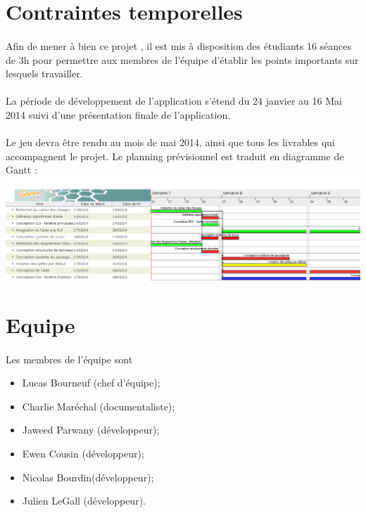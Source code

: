 \section{Contraintes temporelles}
\paragraph*{}
Afin de mener à bien ce projet , il est mis à disposition des étudiants 16 séances de 3h pour permettre aux membres de l'équipe d'établir les points importants sur lesquels travailler.
\paragraph*{}
La période de développement de l’application s’étend du 24 janvier au 16 Mai 2014 suivi d’une présentation finale de l’application. %
\paragraph*{}
Le jeu devra être rendu au mois de mai 2014, ainsi que tous les livrables qui accompagnent le projet.
Le planning prévisionnel est traduit en diagramme de Gantt :
\includegraphics[scale=1]{data/ganttDiagram.png}


\section {Equipe}
\paragraph*{}
Les membres de l'équipe sont 
\begin{itemize}
\item Lucas Bourneuf (chef d'équipe);
\item Charlie Maréchal (documentaliste);
\item Jaweed Parwany (développeur);
\item Ewen Cousin (développeur);
\item Nicolas Bourdin(développeur);
\item Julien LeGall (développeur).
\end{itemize}



